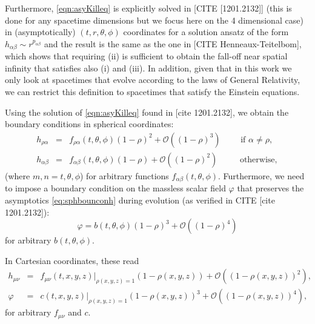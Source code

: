 \documentclass[a4paper,11pt]{article}
\numberwithin{equation}{section}
\begin{document}
Furthermore, \eqref{eqn:asyKilleq} is explicitly solved in [CITE [1201.2132]] (this is done for any spacetime dimensions but we focus here on the 4 dimensional case) in (asymptotically) $(t,r,\theta,\phi)$ coordinates for a solution ansatz of the form $h_{\alpha\beta}\sim r^{p_{\alpha\beta}}$ and the result is the same as the one in [CITE Henneaux-Teitelbom], which shows that requiring (ii) is sufficient to obtain the fall-off near spatial infinity that satisfies also (i) and (iii).
In addition, given that in this work we only look at spacetimes that evolve according to the laws of General Relativity, we can restrict this definition to spacetimes that satisfy the Einstein equations.

Using the solution of \eqref{eqn:asyKilleq} found in [cite 1201.2132], we obtain the boundary conditions in spherical coordinates:
\begin{eqnarray}
\label{eq:sphbounconh}
h_{\rho\alpha}&=&f_{\rho\alpha}(t,\theta,\phi)(1-\rho)^2+\mathcal{O}((1-\rho)^3) \qquad \textrm{ if $\alpha\neq\rho$}, \\ \nonumber
h_{\alpha\beta}&=&f_{\alpha\beta}(t,\theta,\phi)(1-\rho)+\mathcal{O}((1-\rho)^{2}) \qquad\; \textrm{ otherwise},
\end{eqnarray}
(where $m,n=t,\theta,\phi$) for arbitrary functions $f_{\alpha\beta}(t,\theta,\phi)$. Furthermore, we need to impose a boundary condition on the massless scalar field $\varphi$ that preserves the asymptotics \eqref{eq:sphbounconh} during evolution (as verified in CITE [cite 1201.2132]):
\begin{equation}\label{eq:sphbounconphi}
\varphi=b(t,\theta,\phi)(1-\rho)^3+\mathcal{O}((1-\rho)^4)
\end{equation}
for arbitrary $b(t,\theta,\phi)$.

In Cartesian coordinates, these read
\begin{eqnarray}
\label{eq:carbouncondh}
h_{\mu\nu}&=&f_{\mu\nu}(t,x,y,z)|_{\rho(x,y,z)=1}(1-\rho(x,y,z))+\mathcal{O}((1-\rho(x,y,z))^{2}), \\
\label{eq:carbouncondphi}
\varphi&=&c(t,x,y,z)|_{\rho(x,y,z)=1}(1-\rho(x,y,z))^3+\mathcal{O}((1-\rho(x,y,z))^{4}), 
\end{eqnarray}
for arbitrary $f_{\mu\nu}$ and $c$.
\end{document}
